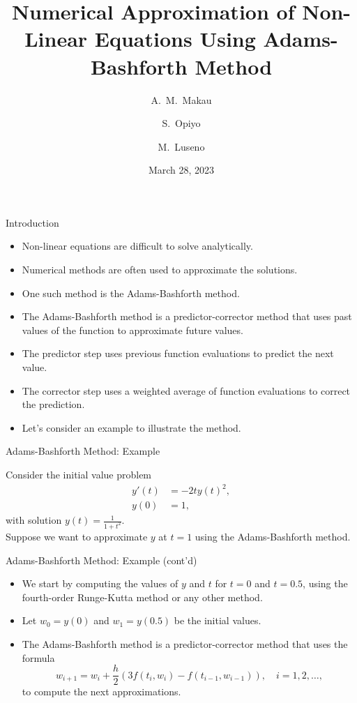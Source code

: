 \documentclass{beamer}
\title{Numerical Approximation of Non-Linear Equations Using Adams-Bashforth Method}
\author[Makau, Opiyo, Luseno] 
{A.~M.~Makau\inst{1} \and S.~Opiyo\inst{2} \and M.~Luseno\inst{3}}
\institute[JKUAT]
{
  \inst{1}%
  SCT211-0469/2021
  
  \and
  \inst{2}%
  SCT211-0509/2021

  \and
  \inst{3}%
  SCT211-0588/2021
}
\date{March 28, 2023}
\begin{document}
\begin{frame}
  \titlepage
\end{frame}

\begin{frame}{Introduction}

\begin{itemize}
    \item Non-linear equations are difficult to solve analytically.
    \item Numerical methods are often used to approximate the solutions.
    \item One such method is the Adams-Bashforth method.
    \item The Adams-Bashforth method is a predictor-corrector method that uses past values of the function to approximate future values.
    \item The predictor step uses previous function evaluations to predict the next value.
    \item The corrector step uses a weighted average of function evaluations to correct the prediction.
    \item Let's consider an example to illustrate the method.
\end{itemize}

\end{frame}

\begin{frame}{Adams-Bashforth Method: Example}
    
Consider the initial value problem
\begin{align*}
y'(t) &= -2ty(t)^2, \\
y(0) &= 1,
\end{align*}
with solution $y(t) = \frac{1}{1+t^2}$. \\ Suppose we want to approximate $y$ at $t=1$ using the Adams-Bashforth method.

\end{frame}

\begin{frame}{Adams-Bashforth Method: Example (cont'd)}

\begin{itemize}
    \item We start by computing the values of $y$ and $t$ for $t=0$ and $t=0.5$, using the fourth-order Runge-Kutta method or any other method.
    \item Let $w_0=y(0)$ and $w_1=y(0.5)$ be the initial values.
    \item The Adams-Bashforth method is a predictor-corrector method that uses the formula
    $$w_{i+1} = w_i + \frac{h}{2}\left(3f(t_i,w_i)-f(t_{i-1},w_{i-1})\right), \quad i=1,2,\ldots,$$
    to compute the next approximations.
\end{itemize}

\end{frame}
\end{document}

